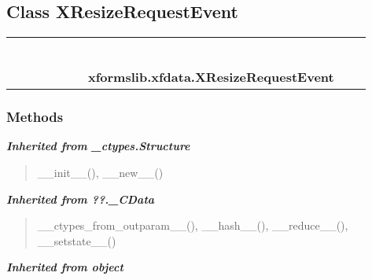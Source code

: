 \subsection{Class XResizeRequestEvent}

    \label{xformslib:xfdata:XResizeRequestEvent}
\begin{tabular}{cccccccccc}
\multicolumn{2}{r}{\settowidth{\BCL}{object}\multirow{2}{\BCL}{object}}
&&
&&
&&
  \\\cline{3-3}
  &&\multicolumn{1}{c|}{}
&&
&&
&&
  \\
\multicolumn{4}{r}{\settowidth{\BCL}{??.\_CData}\multirow{2}{\BCL}{??.\_CData}}
&&
&&
  \\\cline{5-5}
  &&&&\multicolumn{1}{c|}{}
&&
&&
  \\
\multicolumn{6}{r}{\settowidth{\BCL}{\_ctypes.Structure}\multirow{2}{\BCL}{\_ctypes.Structure}}
&&
  \\\cline{7-7}
  &&&&&&\multicolumn{1}{c|}{}
&&
  \\
&&&&&&\multicolumn{2}{l}{\textbf{xformslib.xfdata.XResizeRequestEvent}}
\end{tabular}



  \subsubsection{Methods}


\large{\textbf{\textit{Inherited from \_ctypes.Structure}}}

\begin{quote}
\_\_init\_\_(), \_\_new\_\_()
\end{quote}

\large{\textbf{\textit{Inherited from ??.\_CData}}}

\begin{quote}
\_\_ctypes\_from\_outparam\_\_(), \_\_hash\_\_(), \_\_reduce\_\_(), \_\_setstate\_\_()
\end{quote}

\large{\textbf{\textit{Inherited from object}}}

